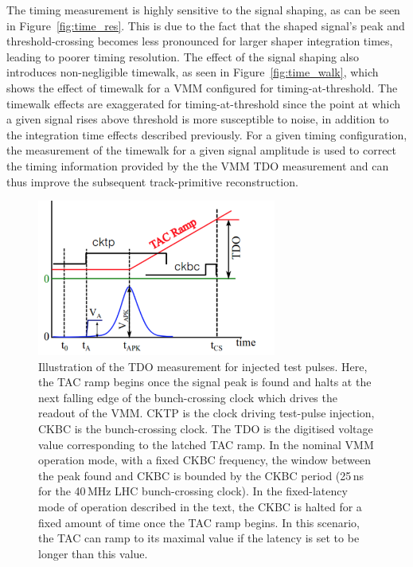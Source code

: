 The timing measurement is highly sensitive to the signal shaping, as can be seen in Figure~\ref{fig:time_res}.
This is due to the fact that the shaped signal's peak and threshold-crossing becomes less pronounced for larger
shaper integration times, leading to poorer timing resolution.
The effect of the signal shaping also introduces non-negligible timewalk, as seen in Figure~\ref{fig:time_walk},
which shows the effect of timewalk for a VMM configured for timing-at-threshold.
The timewalk effects are exaggerated for timing-at-threshold since the point at which a
given signal rises above threshold is more susceptible to noise, in addition to the integration
time effects described previously.
For a given timing configuration, the measurement of the timewalk for a given signal amplitude
is used to correct the timing information provided by the the VMM TDO measurement and can thus
improve the subsequent track-primitive reconstruction.

\begin{figure}[!htb]
    \begin{center}
        \includegraphics[width=0.7\textwidth]{figures/nsw/calibration/tdo_illustration}
        \caption{
            Illustration of the TDO measurement for injected test pulses.
            Here, the TAC ramp begins once the signal peak is found and halts at the next
            falling edge of the bunch-crossing clock which drives the readout of the VMM.
            CKTP is the clock driving test-pulse injection, CKBC is the bunch-crossing clock.
            The TDO is the digitised voltage value corresponding to the latched TAC ramp.
            In the nominal VMM operation mode, with a fixed CKBC frequency, the
            window between the peak found and CKBC is bounded by the CKBC period (25\,ns for the 40\,MHz LHC bunch-crossing clock).
            In the fixed-latency mode of operation described in the text, the CKBC is halted
            for a fixed amount of time once the TAC ramp begins.
            In this scenario, the TAC can ramp to its maximal value if the latency is set to
            be longer than this value.
        }
        \label{fig:tdo_illustration}
    \end{center}
\end{figure}

